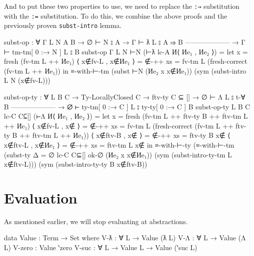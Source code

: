 \documentclass[logo,bsc,singlespacing,parskip,online]{infthesis}
\begin{document}
And to put these two properties to use, we need to replace the \texttt{:→} substitution with the
\texttt{:=} substitution. To do this, we combine the above proofs and the previously proven
\texttt{subst-intro} lemma.
\begin{code}
  subst-op : ∀ {Γ L N A B}
    → ∅ ⊢ N ⦂ A
    → Γ ⊢ ƛ L ⦂ A ⇒ B
      --------------------
    → Γ ⊢ tm-tm[ 0 :→ N ] L ⦂ B
  subst-op {Γ} {L} {N} ⊢N (⊢ƛ lc-A И⟨ Иe₁ , Иe₂ ⟩) =
    let x                  = fresh (fv-tm L ++ Иe₁)
        ⟨ x∉fv-L , x∉Иe₁ ⟩ = ∉-++ {xs = fv-tm L}
                                (fresh-correct (fv-tm L ++ Иe₁))
    in ≡-with-⊢-tm (subst ⊢N (Иe₂ x {x∉Иe₁}))
      (sym (subst-intro L N (x∉fv-L)))

  subst-op-ty : ∀ {L B C}
    → Ty-LocallyClosed C
    → ftv-ty C ⊆ []
    → ∅ ⊢ Λ L ⦂ t-∀ B
      --------------------
    → ∅ ⊢ ty-tm[ 0 :→ C ] L ⦂ ty-ty[ 0 :→ C ] B
  subst-op-ty {L} {B} {C} lc-C C⊆[] (⊢Λ И⟨ Иe₁ , Иe₂ ⟩) =
    let x = fresh (fv-tm L ++ ftv-ty B ++ ftv-tm L ++ Иe₁)
        ⟨ x∉fv-L , x∉ ⟩ = ∉-++ {xs = fv-tm L}
          (fresh-correct (fv-tm L ++ ftv-ty B ++ ftv-tm L ++ Иe₁))
        ⟨ x∉ftv-B , x∉ ⟩ = ∉-++ {xs = ftv-ty B} x∉
        ⟨ x∉ftv-L , x∉Иe₁ ⟩ = ∉-++ {xs = ftv-tm L} x∉
    in ≡-with-⊢-ty (≡-with-⊢-tm
          (subst-ty {Δ = ∅} lc-C C⊆[] ok-∅ (Иe₂ x {x∉Иe₁}))
          (sym (subst-intro-ty-tm L x∉ftv-L)))
      (sym (subst-intro-ty-ty B x∉ftv-B))
\end{code}

\section{Evaluation}
\label{chapter3:evaluation}
As mentioned earlier, we will stop evaluating at abstractions.
\begin{code}
  data Value : Term → Set where
    V-ƛ : ∀ {L} → Value (ƛ L)
    V-Λ : ∀ {L} → Value (Λ L)
    V-zero : Value ‵zero
    V-suc : ∀ {L} → Value L → Value (‵suc L)
\end{code}
\end{document}
